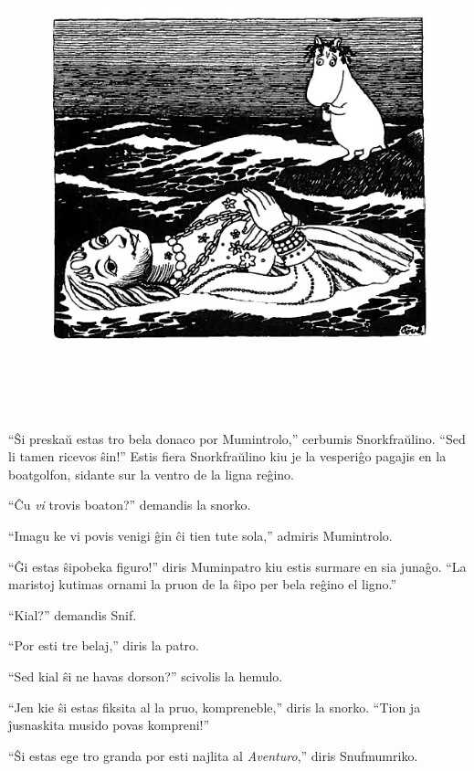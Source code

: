 \begin{figure}[htbp]
\centering
\includegraphics[width=448pt,height=390pt]{_20.jpg}
\caption{}
\label{_20}
\end{figure}

``Ŝi preskaŭ estas tro bela donaco por Mumintrolo,'' cerbumis Snorkfraŭlino. ``Sed li tamen ricevos ŝin!'' Estis fiera Snorkfraŭlino kiu je la vesperiĝo pagajis en la boatgolfon, sidante sur la ventro de la ligna reĝino.

``Ĉu \emph{vi} trovis boaton?'' demandis la snorko.

``Imagu ke vi povis venigi ĝin ĉi tien tute sola,'' admiris Mumintrolo.

``Ĝi estas ŝipobeka figuro!'' diris Muminpatro kiu estis surmare en sia junaĝo. ``La maristoj kutimas ornami la pruon de la ŝipo per bela reĝino el ligno.''

``Kial?'' demandis Snif.

``Por esti tre belaj,'' diris la patro.

``Sed kial ŝi ne havas dorson?'' scivolis la hemulo.

``Jen kie ŝi estas fiksita al la pruo, kompreneble,'' diris la snorko. ``Tion ja ĵusnaskita musido povas kompreni!''

``Ŝi estas ege tro granda por esti najlita al \emph{Aventuro},'' diris Snufmumriko.

